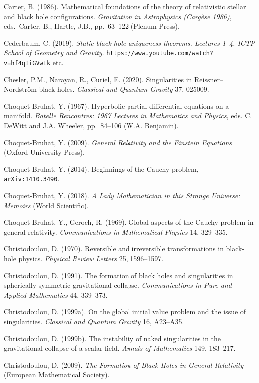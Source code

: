 \documentclass[12pt]{article}
\begin{document}
\begin{small}
\begin{thebibliography}{99}
\item[] Carter, B. (1986). Mathematical foundations of the theory of relativistic stellar and black hole configurations.
\emph{Gravitation in Astrophysics (Carg\`{e}se 1986)}, eds.\ Carter, B., Hartle, J.B., 
pp.\ 63--122 (Plenum Press). 
\item[]  Cederbaum, C. (2019). \emph{Static black hole uniqueness theorems. Lectures 1--4. ICTP School of Geometry and Gravity}. 
\verb#https://www.youtube.com/watch?v=hf4qIiGVwLk# etc.
\item[]  Chesler, P.M.,  Narayan, R.,  Curiel, E. (2020). Singularities in Reissner--Nordstr\"{o}m black holes.
 \emph{Classical and Quantum Gravity} 37, 025009.  
\item[] Choquet-Bruhat, Y. (1967).  Hyperbolic partial differential equations on a manifold.
\emph{Batelle Rencontres: 1967 Lectures in Mathematics and Physics}, eds. 
 C. DeWitt and J.A. Wheeler, pp.\ 84--106 (W.A. Benjamin). 
 \item[]  Choquet-Bruhat, Y. (2009). \emph{General Relativity and the Einstein Equations} (Oxford University Press). 
\item[]  Choquet-Bruhat, Y. (2014). Beginnings of the Cauchy problem, \texttt{arXiv:1410.3490}.
\item[] Choquet-Bruhat, Y. (2018). \emph{A Lady Mathematician in this Strange Universe: Memoirs} (World Scientific).
\item[] Choquet-Bruhat, Y.,  Geroch, R. (1969). Global aspects of the Cauchy problem in general relativity.
 \emph{Communications in Mathematical Physics} 14, 329--335.
 \item[]
 Christodoulou, D. (1970). Reversible and irreversible transformations in black-hole physics. \emph{Physical
Review Letters} 25, 1596--1597.
  \item[] Christodoulou, D.  (1991). The formation of black holes and singularities in spherically symmetric gravitational collapse. 
  \emph{Communications in Pure and Applied Mathematics} 44, 339--373.
 \item[] Christodoulou, D. (1999a). On the global initial value problem and the issue of singularities.
\emph{Classical and Quantum Gravity} 16, A23--A35. 
 \item[] Christodoulou, D. (1999b). The instability of naked singularities in the gravitational collapse of a scalar field.
 \emph{ Annals of Mathematics} 149, 183--217. 
 \item[]  Christodoulou, D. (2009). \emph{The Formation of Black Holes in General Relativity} (European Mathematical Society). 

\end{thebibliography}
\end{small}
\end{document}
